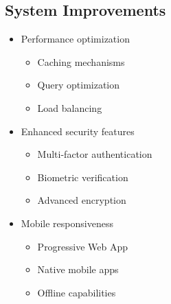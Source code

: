 \documentclass[12pt,a4paper]{article}
\begin{document}
    \subsection{System Improvements}
    \begin{itemize}
        \item Performance optimization
        \begin{itemize}
            \item Caching mechanisms
            \item Query optimization
            \item Load balancing
        \end{itemize}

        \item Enhanced security features
        \begin{itemize}
            \item Multi-factor authentication
            \item Biometric verification
            \item Advanced encryption
        \end{itemize}

        \item Mobile responsiveness
        \begin{itemize}
            \item Progressive Web App
            \item Native mobile apps
            \item Offline capabilities
        \end{itemize}
    \end{itemize}
\end{document}
